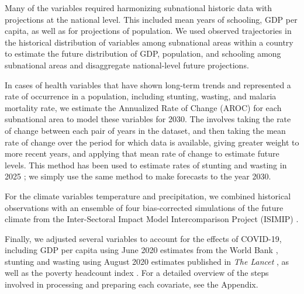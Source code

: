 \documentclass{article}
\begin{document}
Many of the variables required harmonizing subnational historic data with projections at the national level.  This included mean years of schooling, GDP per capita, as well as for projections of population. We used observed trajectories in the historical distribution of variables among subnational areas within a country to estimate the future distribution of GDP, population, and schooling among subnational areas and disaggregate national-level future projections.

In cases of health variables that have shown long-term trends and represented a rate of occurrence in a population, including stunting, wasting, and malaria mortality rate, we estimate the Annualized Rate of Change (AROC) for each subnational area to model these variables for 2030. The involves taking the rate of change between each pair of years in the dataset, and then taking the mean rate of change over the period for which data is available, giving greater weight to more recent years, and applying that mean rate of change to estimate future levels.  This method has been used to estimate rates of stunting and wasting in 2025 \citep{Local2020}; we simply use the same method to make forecasts to the year 2030.

For the climate variables temperature and precipitation, we combined historical observations with an ensemble of four bias-corrected simulations of the future climate from the Inter-Sectoral Impact Model Intercomparison Project (ISIMIP) \citep{warszawski2014inter}.

Finally, we adjusted several variables to account for the effects of COVID-19, including GDP per capita using June 2020 estimates from the World Bank \citep{prospects2020}, stunting and wasting using August 2020 estimates published in \textit{The Lancet} \citep{headey2020impacts}, as well as the poverty headcount index \cite{Cuaresma2018}.  For a detailed overview of the steps involved in processing and preparing each covariate, see the Appendix.
\end{document}
